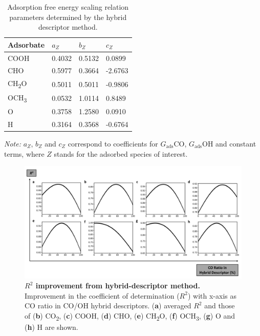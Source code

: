 \begin{table}[htbp]
\label{supp_table13:scaling_params}
  \caption{Adsorption free energy scaling relation parameters
    determined by the hybrid descriptor method.}
  \center
  \small
  \begin{tabularx}{0.75\textwidth}{@{}l *{3}{X} @{}}
    \toprule
    Adsorbate             & $a_Z$   & $b_Z$   & $c_Z$    \\
    \midrule
    COOH                  & 0.4032  & 0.5132  &  0.0899  \\
    CHO                   & 0.5977  & 0.3664  & -2.6763  \\
    CH\textsubscript{2}O  & 0.5011  & 0.5011  & -0.9806  \\
    OCH\textsubscript{3}  & 0.0532  & 1.0114  &  0.8489  \\
    O                     & 0.3758  & 1.2580  &  0.0910  \\
    H                     & 0.3164  & 0.3568  & -0.6764  \\
    \bottomrule
  \end{tabularx}

  \smallskip

  \begin{flushright}
    \begin{minipage}{\textwidth}
      \footnotesize\textit{Note:} $a_{Z}$, $b_{Z}$ and $c_{Z}$ correspond
      to coefficients for $G_{\text{ads}}\text{CO}$, $G_{\text{ads}}\text{OH}$
      and constant terms, where $Z$ stands for the adsorbed species of interest.
  \end{minipage}
  \end{flushright}
\end{table}

\begin{figure}[htbp]
  \centering
  \includegraphics[width=\textwidth]{supp_fig10_r2_hyb_des.png}
  \caption{\textbf{$R^2$ improvement from hybrid-descriptor method.}
  Improvement in the coefficient of determination ($R^2$) with x-axis
  as CO ratio in CO/OH hybrid descriptors.
  (\textbf{a}) averaged $R^2$ and those of (\textbf{b}) CO\textsubscript{2},
  (\textbf{c}) COOH,
  (\textbf{d}) CHO, (\textbf{e}) CH\textsubscript{2}O, (\textbf{f})
  OCH\textsubscript{3}, (\textbf{g}) O and (\textbf{h}) H are shown.}
  \label{supp_fig10:r2_hyb_des}
\end{figure}

